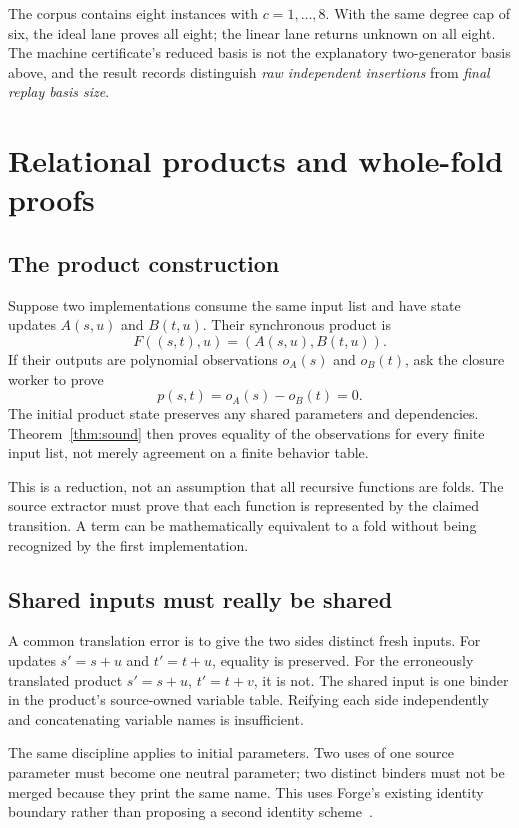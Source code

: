 \documentclass[11pt,letterpaper]{article}
\theoremstyle{definition}
\begin{document}
The corpus contains eight instances with $c=1,\ldots,8$. With the same degree
cap of six, the ideal lane proves all eight; the linear lane returns unknown
on all eight. The machine certificate's reduced basis is not the explanatory
two-generator basis above, and the result records distinguish \emph{raw
independent insertions} from \emph{final replay basis size}.

\section{Relational products and whole-fold proofs}
\label{sec:products}

\subsection{The product construction}
Suppose two implementations consume the same input list and have state updates
$A(s,u)$ and $B(t,u)$. Their synchronous product is
\[
 F((s,t),u)=(A(s,u),B(t,u)).
\]
If their outputs are polynomial observations $o_A(s)$ and $o_B(t)$, ask the
closure worker to prove
\[
 p(s,t)=o_A(s)-o_B(t)=0.
\]
The initial product state preserves any shared parameters and dependencies.
Theorem~\ref{thm:sound} then proves equality of the observations for every finite
input list, not merely agreement on a finite behavior table.

This is a reduction, not an assumption that all recursive functions are folds.
The source extractor must prove that each function is represented by the
claimed transition. A term can be mathematically equivalent to a fold without
being recognized by the first implementation.

\subsection{Shared inputs must really be shared}
A common translation error is to give the two sides distinct fresh inputs.
For updates $s'=s+u$ and $t'=t+u$, equality is preserved. For the erroneously
translated product $s'=s+u$, $t'=t+v$, it is not. The shared input is one binder
in the product's source-owned variable table. Reifying each side independently
and concatenating variable names is insufficient.

The same discipline applies to initial parameters. Two uses of one source
parameter must become one neutral parameter; two distinct binders must not be
merged because they print the same name. This uses Forge's existing identity
boundary rather than proposing a second identity scheme~\cite{forge-integration}.
\end{document}
